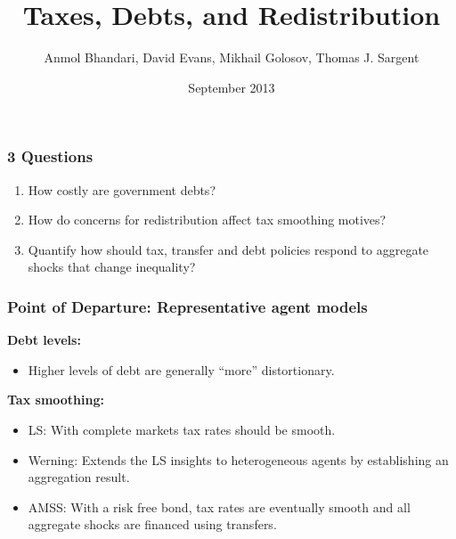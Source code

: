 \documentclass{beamer}
\title {Taxes, Debts,  and Redistribution}
\author{Anmol Bhandari, David Evans, Mikhail Golosov, Thomas J. Sargent}
\date{September 2013}
\begin{document}
%
\begin{frame}
\titlepage

\end{frame}


\begin{frame}
\frametitle{3 Questions}

\begin{enumerate}
 \item How costly are government debts?
 \vspace{2mm} 
 \item How do concerns for redistribution affect tax smoothing motives?
\vspace{2mm} 
 \item Quantify how should tax, transfer and debt policies respond to aggregate shocks that change inequality?
\end{enumerate}

\end{frame}


\begin{frame}
\frametitle{Point of Departure: Representative agent models}
\textbf{Debt levels:}
\begin{itemize}
\item Higher levels of debt are generally ``more'' distortionary. 
\end{itemize}
\textbf{Tax smoothing:}
\begin{itemize}
 \item LS: With complete markets tax rates should be smooth.  
 \vspace{2mm} 
 \item Werning: Extends the LS insights to heterogeneous agents by establishing an aggregation result.
 \vspace{2mm} 
 \item AMSS: With a risk free bond, tax rates are eventually smooth and all aggregate shocks are financed using transfers.
\end{itemize}



\end{frame}
\end{document}
